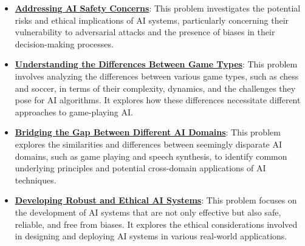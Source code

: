 \documentclass{article}%
\begin{document}
\begin{itemize}[leftmargin=*]
\item \href{https://purdue.brightspace.com/d2l/common/assets/pdfjs-d2l-dist/1.0.14-legacy/web/viewer.html?file=\%2Fcontent\%2Fenforced\%2F1095467-wl.202510.CS.24300.001\%2F02L2-Intro.pdf\%3Fou\%3D1095467\&lang=en-us\&container=d2l-fileviewer-rendered-pdf\&fullscreen=d2l-fileviewer-rendered-pdf-dialog\&height=667#page=19}{\textbf{Addressing AI Safety Concerns}}: This problem investigates the potential risks and ethical implications of AI systems, particularly concerning their vulnerability to adversarial attacks and the presence of biases in their decision{-}making processes.%
\item \href{https://purdue.brightspace.com/d2l/common/assets/pdfjs-d2l-dist/1.0.14-legacy/web/viewer.html?file=\%2Fcontent\%2Fenforced\%2F1095467-wl.202510.CS.24300.001\%2F02L2-Intro.pdf\%3Fou\%3D1095467\&lang=en-us\&container=d2l-fileviewer-rendered-pdf\&fullscreen=d2l-fileviewer-rendered-pdf-dialog\&height=667#page=27}{\textbf{Understanding the Differences Between Game Types}}: This problem involves analyzing the differences between various game types, such as chess and soccer, in terms of their complexity, dynamics, and the challenges they pose for AI algorithms. It explores how these differences necessitate different approaches to game{-}playing AI.%
\item \href{https://purdue.brightspace.com/d2l/common/assets/pdfjs-d2l-dist/1.0.14-legacy/web/viewer.html?file=\%2Fcontent\%2Fenforced\%2F1095467-wl.202510.CS.24300.001\%2F02L2-Intro.pdf\%3Fou\%3D1095467\&lang=en-us\&container=d2l-fileviewer-rendered-pdf\&fullscreen=d2l-fileviewer-rendered-pdf-dialog\&height=667#page=31}{\textbf{Bridging the Gap Between Different AI Domains}}: This problem explores the similarities and differences between seemingly disparate AI domains, such as game playing and speech synthesis, to identify common underlying principles and potential cross{-}domain applications of AI techniques.%
\item \href{https://purdue.brightspace.com/d2l/common/assets/pdfjs-d2l-dist/1.0.14-legacy/web/viewer.html?file=\%2Fcontent\%2Fenforced\%2F1095467-wl.202510.CS.24300.001\%2F02L2-Intro.pdf\%3Fou\%3D1095467\&lang=en-us\&container=d2l-fileviewer-rendered-pdf\&fullscreen=d2l-fileviewer-rendered-pdf-dialog\&height=667#page=20}{\textbf{Developing Robust and Ethical AI Systems}}: This problem focuses on the development of AI systems that are not only effective but also safe, reliable, and free from biases. It explores the ethical considerations involved in designing and deploying AI systems in various real{-}world applications.%

\end{itemize}
\end{document}
